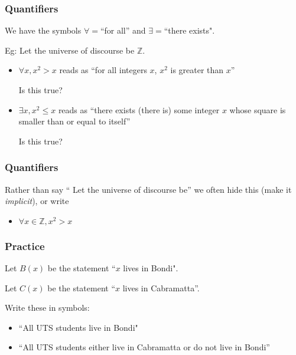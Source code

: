 \documentclass[10pt]{beamer}
\theoremstyle{definition}
\newcommand{\Z}{\ensuremath{\mathbb{Z}}}
\begin{document}
\begin{frame}
\frametitle{Quantifiers}



We have the symbols $\forall=$``for all''  and $\exists=$``there exists".



\bigskip
Eg: Let the universe of discourse be $\Z$. \begin{itemize}\item 
$\forall x, x^2>x$ reads as ``for all integers $x$, $x^2$ is greater than $x$''

\bigskip

Is this true?
\pause \bigskip

\item 
$\exists x, x^2\leq x$ reads as ``there exists (there is) some  integer $x$ whose square is smaller than or equal to itself''
\bigskip

Is this true?

\end{itemize}
\vspace{2cm}
\vfill
\end{frame}




\begin{frame}
\frametitle{Quantifiers}



Rather than say `` Let the universe of discourse be''
we often hide this (make it {\em implicit}), or write 

\bigskip
\begin{itemize}\item 
$\forall x\in \Z, x^2>x$ 
\end{itemize}
\vspace{2cm}
\vfill
\end{frame}




\begin{frame}
\frametitle{Practice}

Let $B(x)$ be the statement  ``$x$ lives in Bondi". 


Let $C(x)$ be the statement ``$x$ lives in Cabramatta''.
\bigskip\pause

Write these in symbols:

\bigskip
\begin{itemize}\item 
``All UTS students live in Bondi" 
\item \bigskip\bigskip
``All UTS students either live in Cabramatta or do not live in Bondi''
\end{itemize}
\vspace{2cm}
\vfill
\end{frame}
\end{document}
